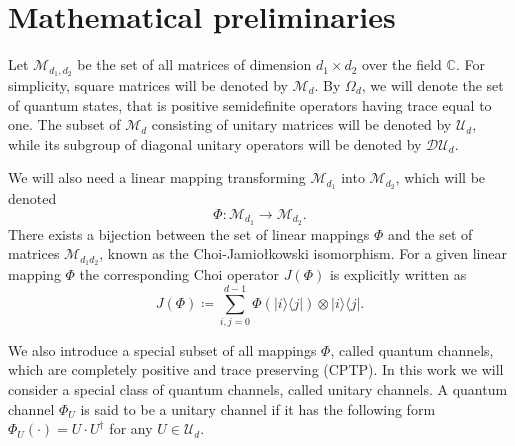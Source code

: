 \documentclass[preprint,12pt, a4paper, dvipsnames]{elsarticle}
\newcommand{\ket}[1]{\ensuremath{|#1\rangle}}
\newcommand{\bra}[1]{\ensuremath{\langle#1|}}
\newcommand{\ketbra}[2]{\ensuremath{\ket{#1}\bra{#2}}}
\newcommand{\1}{{\rm 1\hspace{-0.9mm}l}}
\newcommand{\DD}{\mathcal{D}}
\newcommand{\UU}{\mathcal{U}}
\theoremstyle{definition}
\begin{document}





\appendix

\section{Mathematical preliminaries} \label{app:preliminaries}

Let $\mathcal{M}_{d_1,d_2}$ be the set of all matrices of dimension $d_1 \times d_2$ over
the field $\mathbb{C}$. For  simplicity, square matrices will be denoted by
$\mathcal{M}_d$.
By $\Omega_d$, we will denote the set of quantum states, that is
positive semidefinite operators having trace equal to one.
The subset of $\mathcal{M}_d$ consisting of unitary matrices will be denoted
by $\UU_d$, while its subgroup of diagonal unitary operators will be denoted by
$\DD \UU_d$.


We will also need a linear mapping transforming $\mathcal{M}_{d_1}$ into
$\mathcal{M}_{d_2}$, which will be denoted
\begin{equation}
\Phi: \mathcal{M}_{d_1 } \rightarrow \mathcal{M}_{d_2}.
\end{equation}
There
exists a bijection between the set of linear mappings $\Phi$ and the set of matrices $\mathcal{M}_{d_1d_2}$,  known as the Choi-Jamio{\l}kowski isomorphism.
For a given linear mapping $\Phi$ the corresponding Choi operator $J(\Phi)$ is explicitly written as
\begin{equation}
J(\Phi) \coloneqq \sum_{i,j=0}^{d- 1} \Phi(\ketbra{i}{j}) \otimes \ketbra{i}{j}. \end{equation}

We also introduce a special subset of all mappings $\Phi$, called quantum channels, which are completely positive
and trace preserving (CPTP).
In this work we will consider a special class of quantum channels, called unitary channels.  A
quantum channel
$\Phi_{U}$ is said to be a unitary channel if it has the following form $\Phi_U(\cdot) = U \cdot U^\dagger$ for any $U \in
\UU_d$.
\end{document}
